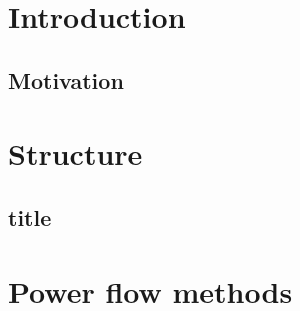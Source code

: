 \documentclass[11pt,fleqn]{book} %
\begin{document}

\pagestyle{empty} %

\renewcommand\contentsname{Table of content}
\renewcommand{\bibname}{Bibliography}
\tableofcontents%


\pagestyle{fancy} %



\chapter{Introduction}

\section{Motivation}

  \vspace{1em}



  \vspace{2em}



\chapter{Structure}

\section{title}



\chapter{Power flow methods}
\end{document}
